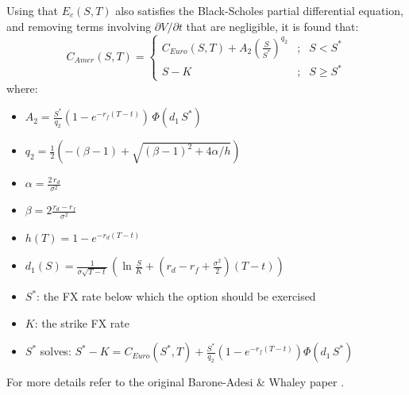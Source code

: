 Using that $E_c (S,T)$ also satisfies the Black-Scholes partial differential equation,
and removing terms involving $\partial V / \partial t$ that are negligible, it is found
that:
$$
C_{Amer} (S,T)=\left\{ \begin{array}{lcl}
C_{Euro}(S,T) + A_2\left(\frac{S}{S^*}\right)^{q_2} &;& S < S^*\\
S-K &;& S\geq S^*
\end{array}
\right.
$$
where:
\begin{itemize}
\item $\displaystyle A_2=\frac{S^*}{q_2} \left(1-e^{-r_f (T-t)}\right)\,\Phi(d_1\,S^*)$
\item $\displaystyle q_2=\frac{1}{2}\left(-(\beta-1)+\sqrt{(\beta-1)^2+4\alpha/h}\right)$
\item $\displaystyle \alpha =\frac{2\,r_d}{\sigma^2}$
\item $\displaystyle \beta=2\frac{r_d-r_f}{\sigma^2}$
\item $\displaystyle h(T)=1-e^{-r_d (T-t)}$
\item $\displaystyle d_1(S)=\frac{1}{\sigma\sqrt{T-t}}\,
	\left(\ln\frac{S}{K}+\left(r_d - r_f + \frac{\sigma^2}{2}\right)(T-t)\right)$
\item $S^*$: the FX rate below which the option should be exercised
\item $K$: the strike FX rate
\item $S^*$ solves:
$\displaystyle S^*-K = C_{Euro}(S^*,T) + \frac{S^*}{q_2}  \left(1-e^{-r_f (T-t)}\right) \Phi(d_1 \,S^*)$
\end{itemize}

For more details refer to the original Barone-Adesi \& Whaley paper \cite{Barone-Adesi_1987}.

